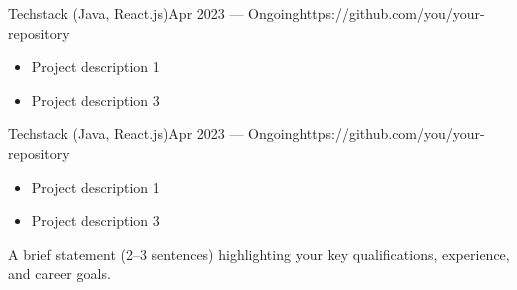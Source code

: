 \documentclass[10pt,a4paper,ragged2e,withhyper]{nextcv}
\begin{document}
\begin{paracol}{2}
{Techstack (Java, React.js)}{Apr 2023 --- Ongoing}{https://github.com/you/your-repository}
\begin{itemize}
  \item Project description 1
  \item Project description 3
\end{itemize}

\divider%

{Techstack (Java, React.js)}{Apr 2023 --- Ongoing}{https://github.com/you/your-repository}
\begin{itemize}
  \item Project description 1
  \item Project description 3
\end{itemize}

\switchcolumn%


A brief statement (2--3 sentences) highlighting your key qualifications, experience, and career goals.



\medskip%
\medskip%

\divider\smallskip

\\

\divider\smallskip

\\




\divider%


\divider%




\end{paracol}
\end{document}

